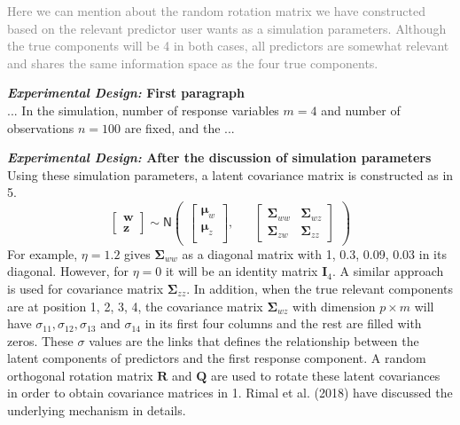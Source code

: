 \documentclass[12pt, a4paper]{scrartcl}
\begin{document}
\textcolor{gray}{Here we can mention about the random rotation matrix we have constructed based on the relevant predictor user wants as a simulation parameters. Although the true components will be 4 in both cases, all predictors are somewhat relevant and shares the same information space as the four true components.}

\textcolor{answers}{
\textcolor{mycolor1}{\textbf{\textit{Experimental Design:} First paragraph}}\hfill \\
... In the simulation, number of response variables $m = 4$ and number of observations $n = 100$ are fixed, and the ...}

\textcolor{answers}{
\textcolor{mycolor1}{\textbf{\textit{Experimental Design:} After the discussion of simulation parameters}}\hfill \\
Using these simulation parameters, a latent covariance matrix is constructed as in 5.
\begin{equation*}
  \begin{bmatrix}
    \mathbf{w} \\ \mathbf{z}
  \end{bmatrix} 
  \sim \mathsf{N}
  \begin{pmatrix}
    \begin{bmatrix}
      \boldsymbol{\mu}_w \\
      \boldsymbol{\mu}_z \\
    \end{bmatrix}, &&
    \begin{bmatrix}
      \boldsymbol{\Sigma}_{ww} & \boldsymbol{\Sigma}_{wz} \\
      \boldsymbol{\Sigma}_{zw} & \boldsymbol{\Sigma}_{zz} 
    \end{bmatrix}
  \end{pmatrix}
\end{equation*}
For example, $\eta=1.2$ gives $\boldsymbol{\Sigma}_{ww}$ as a diagonal matrix with 1, 0.3, 0.09, 0.03 in its diagonal. However, for $\eta=0$ it will be an identity matrix $\mathbf{I}_4$. A similar approach is used for covariance matrix $\boldsymbol{\Sigma}_{zz}$. In addition, when the true relevant components are at position 1, 2, 3, 4, the covariance matrix $\boldsymbol{\Sigma}_{wz}$ with dimension $p \times m$ will have $\sigma_{11}, \sigma_{12}, \sigma_{13}$ and $\sigma_{14}$ in its first four columns and the rest are filled with zeros. These $\sigma$ values are the links that defines the relationship between the latent components of predictors and the first response component. A random orthogonal rotation matrix $\mathbf{R}$ and $\mathbf{Q}$ are used to rotate these latent covariances in order to obtain covariance matrices in 1. Rimal et al. (2018) have discussed the underlying mechanism in details.
}
\end{document}
